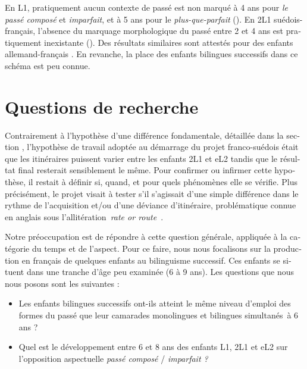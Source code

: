 \documentclass[french, output=paper]{langscibook}
\begin{document}
\begin{otherlanguage}{french}
\begin{enumerate}[label=\roman*.]
\end{enumerate}

En L1, pratiquement aucun contexte de passé est non marqué à 4 ans pour \textit{le passé composé} et \textit{imparfait}, et à 5 ans pour le \textit{plus-que-parfait} (\citealt{Bronckart1976, Fayol1982, Labelle1994, Jakubowicz2003}). En 2L1 suédois-français, l’absence du marquage morphologique du passé entre 2 et 4 ans est pratiquement inexistante (\citealt{Schlyter1996, Schlyter2011}). Des résultats similaires sont attestés pour des enfants allemand-français \citep{Rieckborn2007}. En revanche, la place des enfants bilingues successifs dans ce schéma est peu connue.


\section{Questions de recherche}\label{sec:kihlstedt:3}

Contrairement à l’hypothèse d’une différence fondamentale, détaillée dans la section , l’hypothèse de travail adoptée au démarrage du projet franco-suédois était que les itinéraires puissent varier entre les enfants 2L1 et eL2 tandis que le résultat final resterait sensiblement le même. Pour confirmer ou infirmer cette hypothèse, il restait à définir si, quand, et pour quels phénomènes elle se vérifie. Plus précisément, le projet visait à tester s’il s’agissait d’une simple différence dans le rythme de l’acquisition et/ou d’une déviance d’itinéraire, problématique connue en anglais sous l’allitération~\textit{rate or route~}\citep{Paradis2007}. 



Notre préoccupation est de répondre à cette question générale, appliquée à la catégorie du temps et de l’aspect. Pour ce faire, nous nous focalisons sur la production en français de quelques enfants au bilinguisme successif. Ces enfants se situent dans une tranche d’âge peu examinée (6 à 9 ans). Les questions que nous nous posons sont les suivantes :


\begin{itemize}
\item 
Les enfants bilingues successifs ont-ils atteint le même niveau d’emploi des formes du passé que leur camarades monolingues et bilingues simultanés~à 6 ans ?

\item 
Quel est le développement entre 6 et 8 ans des enfants L1, 2L1 et eL2 sur l’opposition aspectuelle \textit{passé composé} / \textit{imparfait ?}


\end{itemize}
\end{otherlanguage}
\end{document}
